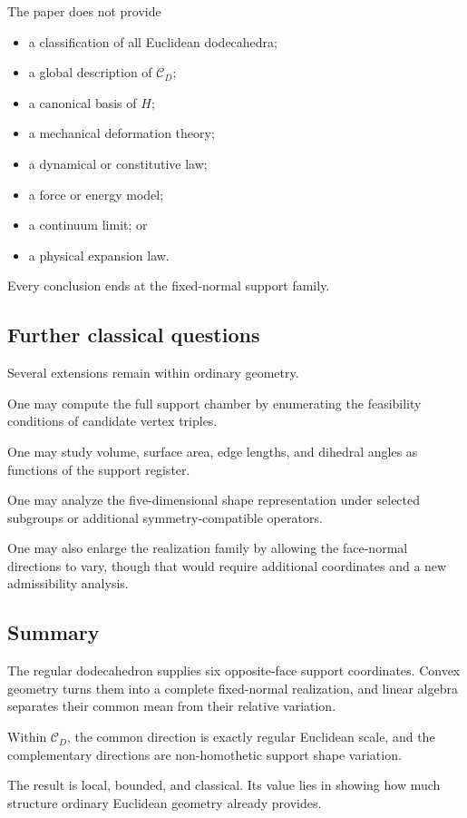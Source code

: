 The paper does not provide

\begin{itemize}
\item a classification of all Euclidean dodecahedra;
\item a global description of \(\mathcal C_D\);
\item a canonical basis of \(H\);
\item a mechanical deformation theory;
\item a dynamical or constitutive law;
\item a force or energy model;
\item a continuum limit; or
\item a physical expansion law.
\end{itemize}

Every conclusion ends at the fixed-normal support family.

\subsection{Further classical questions}

Several extensions remain within ordinary geometry.

One may compute the full support chamber by enumerating the feasibility
conditions of candidate vertex triples.

One may study volume, surface area, edge lengths, and dihedral angles as
functions of the support register.

One may analyze the five-dimensional shape representation under selected
subgroups or additional symmetry-compatible operators.

One may also enlarge the realization family by allowing the face-normal
directions to vary, though that would require additional coordinates and a
new admissibility analysis.

\subsection{Summary}

The regular dodecahedron supplies six opposite-face support coordinates.
Convex geometry turns them into a complete fixed-normal realization, and
linear algebra separates their common mean from their relative variation.

Within \(\mathcal C_D\), the common direction is exactly regular Euclidean
scale, and the complementary directions are non-homothetic support shape
variation.

The result is local, bounded, and classical. Its value lies in showing how
much structure ordinary Euclidean geometry already provides.
